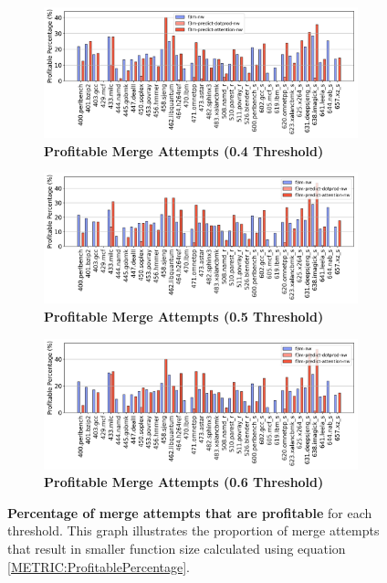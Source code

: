 \begin{figure}[p!]
    \centering
    \begin{subfigure}{\textwidth}
        \centering
        \includegraphics[scale=0.47]{Figures/Valid_Merging_Predictions/0.4_ProfitablePercentage.png}
        \caption{\textbf{Profitable Merge Attempts (\textbf{0.4} Threshold)}} 
        \label{fig:0.4ProfitableMerges}
    \end{subfigure}
    \begin{subfigure}{\textwidth}
        \centering
        \includegraphics[scale=0.47]{Figures/Valid_Merging_Predictions/0.5_ProfitablePercentage.png}
        \caption{\textbf{Profitable Merge Attempts (\textbf{0.5} Threshold)}} 
        \label{fig:0.5ProfitableMerges}
    \end{subfigure}
    \begin{subfigure}{\textwidth}
    \centering
        \includegraphics[scale=0.47]{Figures/Valid_Merging_Predictions/0.6_ProfitablePercentage.png}
        \caption{\textbf{Profitable Merge Attempts (\textbf{0.6} Threshold)}} 
        \label{fig:0.6ProfitableMerges}
    \end{subfigure}

    \caption{\textbf{Percentage of merge attempts that are profitable} for each threshold. This graph illustrates the proportion of merge attempts that result in smaller function size calculated using equation \ref{METRIC:ProfitablePercentage}.} 
    \label{fig:ProfitableMerges}
\end{figure}



